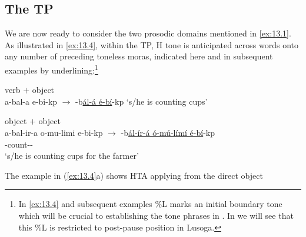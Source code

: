 \documentclass[output=paper]{langsci/langscibook}
\begin{document}
\subsection{The TP}\label{sub:13.2.1}

We are now ready to consider the two prosodic domains mentioned in
\eqref{ex:13.1}. As illustrated in \eqref{ex:13.4}, within the \gls{TP},
H tone is anticipated across words onto any number of preceding toneless moras,
indicated here and in subsequent examples by underlining:\footnote{In
\eqref{ex:13.4} and subsequent examples \%L marks an initial boundary tone which
will be crucial to establishing the tone phrases in . In
 we will see that this \%L is restricted to post-pause
position in Lusoga.}

\ea\label{ex:13.4}
    \ea verb $+$ object\\
        a-bal-a e-bi-kp ${\rightarrow}$ -b\underline{ál-á é-bí}-kp ‘s/he is counting cups’
        \vspace{.75\baselineskip}
    \ex object $+$ object\\
        a-bal-ir-a  o-mu-limi  e-bi-kp  ${\rightarrow}$
            -b\underline{ál-ír-á ó-mú-límí  é-bí}-kp\\
        \Tsg{}-count-\Appl-\Fv{}\\
        ‘s/he is counting cups for the farmer’
    \z
\z
The example in (\ref{ex:13.4}a) shows \gls{HTA} applying from the direct object
\end{document}
